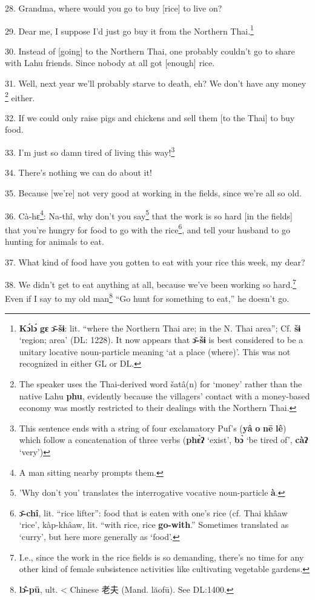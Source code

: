 28. Grandma, where would you go to buy [rice] to live on?

29. Dear me, I suppose I'd just go buy it from the Northern Thai.\footnote{\textbf{Kɔ́lɔ́} \textbf{gɛ} \textbf{ɔ̄-šɨ}: lit. ``where the Northern Thai are; in the N. Thai area''; Cf. \textbf{šɨ} `region; area' (DL: 1228). It now appears that \textbf{ɔ̄-šɨ} is best considered to be a unitary locative noun-particle meaning `at a place (where)'. This was not recognized in either GL or DL.}

30. Instead of [going] to the Northern Thai, one probably couldn't go to share
with Lahu friends. Since nobody at all got [enough] rice.

31. Well, next year we'll probably starve to death, eh? We don't have any money
\footnote{The speaker uses the Thai-derived word šatâ(n) for `money' rather than the native Lahu \textbf{phu}, evidently because the villagers' contact with a money-based economy was mostly restricted to their dealings with the Northern Thai.} either.

32. If we could only raise pigs and chickens and sell them [to the Thai] to buy
food.

33. I'm just so damn tired of living this way!\footnote{This sentence ends with a string of four exclamatory Puf's (\textbf{yâ} \textbf{o} \textbf{nē} \textbf{lê}) which follow a concatenation of three verbs (\textbf{phɛ̀ʔ} `exist', \textbf{bɔ̀} `be tired of', \textbf{càʔ} `very')}

34. There's nothing we can do about it!

35. Because [we're] not very good at working in the fields, since we're all so
old.


36. Cà-hɛ\footnote{A man sitting nearby prompts them.}: Na-thî, why don't you say\footnote{'Why don't you' translates the interrogative vocative noun-particle \textbf{à}.} that the work is so hard [in
the fields] that you're hungry for food to go with the rice\footnote{\textbf{ɔ̄-chî}, lit. ``rice lifter'': food that is eaten with one's rice (cf. Thai khâaw `rice', kàp-khâaw, lit. ``with rice, rice \textbf{go-with}.'' Sometimes translated as `curry', but here more generally as `food'.}, and tell your
husband to go hunting for animals to eat.

37. What kind of food have you gotten to eat with your rice this week, my dear?

38. We didn't get to eat anything at all, because we've been working so hard.\footnote{I.e., since the work in the rice fields is so demanding, there's no time for any other kind of female subsistence activities like cultivating vegetable gardens.}
Even if I say to my old man\footnote{\textbf{lɔ̂-pū}, ult. < Chinese 老夫 (Mand. lăofū). See DL:1400.} ``Go hunt for something to eat,'' he doesn't go.

